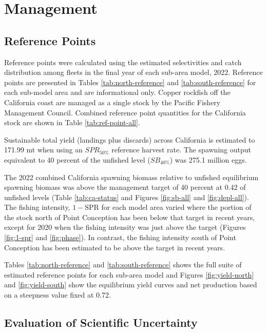 \documentclass[11pt,
  english,
  letterpaper,
]{article}
\begin{document}
\hypertarget{management}{%
\section{Management}\label{management}}

\hypertarget{reference-points-1}{%
\subsection{Reference Points}\label{reference-points-1}}

Reference points were calculated using the estimated selectivities and catch distribution among fleets in the final year of each sub-area model, 2022. Reference points are presented in Tables \ref{tab:north-reference} and \ref{tab:south-reference} for each sub-model area and are informational only. Copper rockfish off the California coast are managed as a single stock by the Pacific Fishery Management Council. Combined reference point quantities for the California stock are shown in Table \ref{tab:ref-point-all}.

Sustainable total yield (landings plus discards) across California is estimated to 171.99 mt when using an \(SPR_{50\%}\) reference harvest rate. The spawning output equivalent to 40 percent of the unfished level (\(SB_{40\%}\)) was 275.1 million eggs.

The 2022 combined California spawning biomass relative to unfished equilibrium spawning biomass was above the management target of 40 percent at 0.42 of unfished levels (Table \ref{tab:ca-status} and Figures \ref{fig:sb-all} and \ref{fig:depl-all}). The fishing intensity, \(1-\text{SPR}\) for each model area varied where the portion of the stock north of Point Conception has been below that target in recent years, except for 2020 when the fishing intensity was just above the target (Figures \ref{fig:1-spr} and \ref{fig:phase}). In contrast, the fishing intensity south of Point Conception has been estimated to be above the target in recent years.

Tables \ref{tab:north-reference} and \ref{tab:south-reference} shows the full suite of estimated reference points for each sub-area model and Figures \ref{fig:yield-north} and \ref{fig:yield-south} show the equilibrium yield curves and net production based on a steepness value fixed at 0.72.

\hypertarget{evaluation-of-scientific-uncertainty}{%
\subsection{Evaluation of Scientific Uncertainty}\label{evaluation-of-scientific-uncertainty}}
\end{document}

